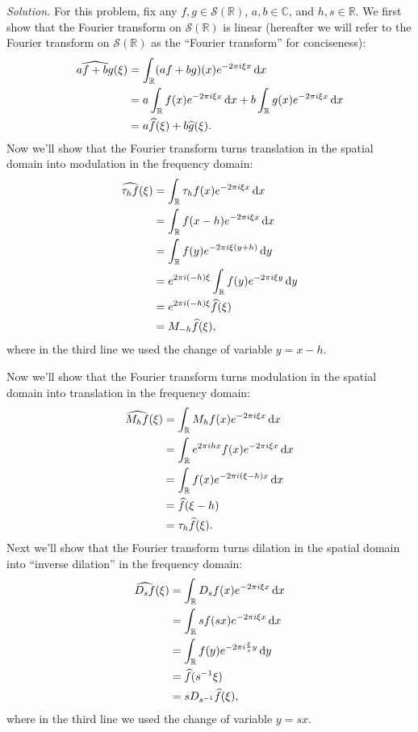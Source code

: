 \documentclass{article}
\newcommand{\C}{\mathbb{C}}
\newcommand{\R}{\mathbb{R}}
\newcommand{\fS}{\mathcal{S}}
\begin{document}
\textit{Solution.}
For this problem, fix any $f, g \in \fS(\R)$, $a, b \in \C$, and
$h, s \in \R$. We first show that the Fourier transform on $\fS(\R)$ is
linear (hereafter we will refer to the Fourier transform on
$\fS(\R)$ as the ``Fourier transform'' for conciseness):
%
\begin{align*}
    \widehat{af + b g}(\xi)
        &= \int_{\R} (af + b g)(x) e^{- 2 \pi i \xi x} \dif x \\
        &=
        a \int_{\R} f(x) e^{- 2 \pi i \xi x} \dif x
        +
        b \int_{\R} g(x) e^{- 2 \pi i \xi x} \dif x
        \\
        &= a \widehat{f}(\xi) + b \widehat{g}(\xi)
        .
\end{align*}
%
Now we'll show that the Fourier transform turns translation in the
spatial domain into modulation in the frequency domain:
%
\begin{align*}
    \widehat{\tau_h f}(\xi)
        &= \int_{\R} \tau_h f(x) e^{- 2 \pi i \xi x} \dif x \\
        &= \int_{\R} f(x - h) e^{- 2 \pi i \xi x} \dif x \\
        &= \int_{\R} f(y) e^{- 2 \pi i \xi (y + h)} \dif y \\
        &= e^{2 \pi i (-h) \xi} \int_{\R} f(y) e^{- 2 \pi i \xi y} \dif y \\
        &= e^{2 \pi i (-h) \xi} \widehat{f}(\xi) \\
        &= M_{-h} \widehat{f}(\xi)
        ,
\end{align*}
%
where in the third line we used the change of variable $y = x - h$.

Now we'll show that the Fourier transform turns modulation in the
spatial domain into translation in the frequency domain:
%
\begin{align*}
    \widehat{M_h f}(\xi)
        &= \int_{\R} M_h f(x) e^{- 2 \pi i \xi x} \dif x \\
        &= \int_{\R} e^{2 \pi i h x} f(x) e^{- 2 \pi i \xi x} \dif x \\
        &= \int_{\R} f(x) e^{- 2 \pi i (\xi - h) x} \dif x \\
        &= \widehat{f}(\xi - h) \\
        &= \tau_h \widehat{f}(\xi)
        .
\end{align*}
%
Next we'll show that the Fourier transform turns dilation in the
spatial domain into ``inverse dilation'' in the frequency domain:
%
\begin{align*}
    \widehat{D_s f}(\xi)
        &= \int_{\R} D_s f(x) e^{- 2 \pi i \xi x} \dif x \\
        &= \int_{\R} s f(s x) e^{- 2 \pi i \xi x} \dif x \\
        &= \int_{\R} f(y) e^{- 2 \pi i \frac{\xi}{s} y} \dif y \\
        &= \widehat{f}(s^{-1} \xi) \\
        &= s D_{s^{-1}} \widehat{f}(\xi)
        ,
\end{align*}
%
where in the third line we used the change of variable $y = s x$.
\end{document}
